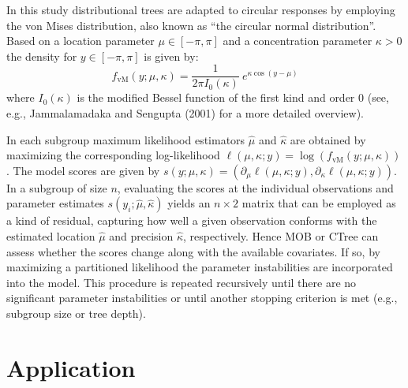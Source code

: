 \documentclass[twoside]{report}
\begin{document}
In this study distributional trees are adapted to circular responses by employing the von Mises
distribution, also known as ``the circular normal distribution''. Based on a location parameter
$\mu \in [-\pi, \pi]$ and a concentration parameter $\kappa > 0$ the density for $y \in [-\pi, \pi]$
is given by:
\begin{equation}
  f_\mathrm{vM}(y; \mu, \kappa) = \frac{1}{2 \pi I_0(\kappa)}~e^{ \kappa \cos(y - \mu)}\label{schlosser:equ_vm}
\end{equation}
where $I_0(\kappa)$ is the modified Bessel function of the first kind and order $0$
(see, e.g., Jammalamadaka and Sengupta (2001) for a more detailed overview).

In each subgroup maximum likelihood estimators $\hat \mu$ and $\hat \kappa$ are obtained
by maximizing the corresponding log-likelihood $\ell(\mu, \kappa; y) = \log(f_\mathrm{vM}(y;\mu, \kappa))$. 
The model scores are given by  $s(y; \mu, \kappa) = (\partial_{\mu} \ell(\mu, \kappa; y),
\partial_{\kappa} \ell(\mu, \kappa; y))$. In a subgroup of size $n$, evaluating the scores
at the individual observations and parameter estimates $s(y_i; \hat{\mu}, \hat{\kappa})$
yields an $n \times 2$ matrix that can be employed as a kind of residual, capturing how well
a given observation conforms with the estimated location $\hat{\mu}$ and precision $\hat{\kappa}$, 
respectively.
Hence MOB or CTree can assess whether the scores change along with the available covariates.
If so, by maximizing a partitioned likelihood
the parameter instabilities are incorporated into the model. This procedure is repeated recursively
until there are no significant parameter instabilities or until another stopping criterion
is met (e.g., subgroup size or tree depth).


\section{Application}
\end{document}
